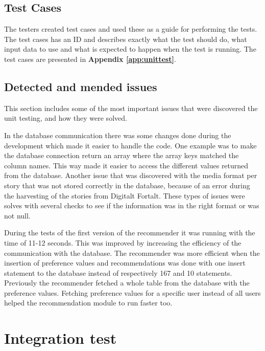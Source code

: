 \subsection{Test Cases}
The testers created test cases and used these as a guide for performing the tests. The test cases has an ID and describes exactly what the test should do, what input data to use and what is expected to happen when the test is running. The test cases are presented in \textbf{Appendix \ref{app:unittest}}.

\subsection{Detected and mended issues}
This section includes some of the most important issues that were discovered the unit testing, and how they were solved. 

In the database communication there was some changes done during the development which made it easier to handle the code. One example was to make the database connection return an array where the array keys matched the column names. This way made it easier to access the different values returned from the database.  
Another issue that was discovered with the media format per story that was not stored correctly in the database, because of an error during the harvesting of the stories from Digitalt Fortalt. These types of issues were solves with several checks to see if the information was in the right format or was not null. 

During the tests of the first version of the recommender it was running with the time of 11-12 seconds. This was improved by increasing the efficiency of the communication with the database. The recommender was more efficient when the insertion of preference values and recommendations was done with one insert statement to the database instead of respectively 167 and 10 statements. Previously the recommender fetched a whole table from the database with the preference values. Fetching preference values for a specific user instead of all users helped the recommendation module to run faster too.




\section{Integration test}
\label{sec:integration_testing}

